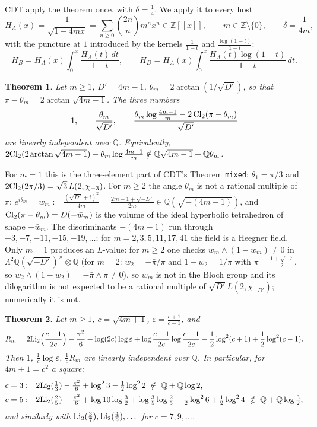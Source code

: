 \documentclass[11pt]{amsart}
\newtheorem{theorem}{Theorem}[section]
\theoremstyle{remark}
\newcommand{\Q}{\mathbb Q}\newcommand{\Z}{\mathbb Z}\newcommand{\R}{\mathbb R}\newcommand{\C}{\mathbb C}
\begin{document}
CDT apply the theorem once, with $\delta=\frac14$. We apply it to every host
\begin{equation}\label{host}
H_A(x)=\frac1{\sqrt{1-4mx}}=\sum_{n\ge0}\binom{2n}nm^nx^n\in\Z[[x]],\qquad m\in\Z\setminus\{0\},\qquad\delta=\frac1{4m},
\end{equation}
with the puncture at $1$ introduced by the kernels $\frac1{1-t}$ and $\frac{\log(1-t)}{1-t}$:
\[
H_B=H_A(x)\int_0^x\frac{H_A(t)\,dt}{1-t},\qquad H_D=H_A(x)\int_0^x\frac{H_A(t)\log(1-t)}{1-t}\,dt .
\]

\begin{theorem}\label{A}
Let $m\ge1$, $D'=4m-1$, $\theta_m=2\arctan(1/\sqrt{D'})$, so that $\pi-\theta_m=2\arctan\sqrt{4m-1}$. The three numbers
\[
1,\qquad\frac{\theta_m}{\sqrt{D'}},\qquad\frac{\theta_m\log\frac{4m-1}m-2\,\mathrm{Cl}_2(\pi-\theta_m)}{\sqrt{D'}}
\]
are linearly independent over $\Q$. Equivalently, $2\Cl(2\arctan\sqrt{4m-1})-\theta_m\log\frac{4m-1}m\notin\Q\sqrt{4m-1}+\Q\theta_m$.
\end{theorem}

For $m=1$ this is the three-element part of CDT's Theorem \texttt{mixed}: $\theta_1=\pi/3$ and $2\mathrm{Cl}_2(2\pi/3)=\sqrt3\,L(2,\chi_{-3})$. For $m\ge2$ the angle $\theta_m$ is not a rational multiple of $\pi$: $e^{i\theta_m}=w_m:=\frac{(\sqrt{D'}+i)^2}{4m}=\frac{2m-1+\sqrt{-D'}}{2m}\in\Q(\sqrt{-(4m-1)})$, and $\mathrm{Cl}_2(\pi-\theta_m)=D(-\bar w_m)$ is the volume of the ideal hyperbolic tetrahedron of shape $-\bar w_m$. The discriminants $-(4m-1)$ run through $-3,-7,-11,-15,-19,\dots$; for $m=2,3,5,11,17,41$ the field is a Heegner field. Only $m=1$ produces an $L$-value: for $m\ge2$ one checks $w_m\wedge(1-w_m)\ne0$ in $\Lambda^2\Q(\sqrt{-D'})^\times\otimes\Q$ (for $m=2$: $w_2=-\bar\pi/\pi$ and $1-w_2=1/\pi$ with $\pi=\frac{1+\sqrt{-7}}2$, so $w_2\wedge(1-w_2)=-\bar\pi\wedge\pi\ne0$), so $w_m$ is not in the Bloch group and its dilogarithm is not expected to be a rational multiple of $\sqrt{D'}L(2,\chi_{-D'})$; numerically it is not.

\begin{theorem}\label{B}
Let $m\ge1$, $c=\sqrt{4m+1}$, $\varepsilon=\frac{c+1}{c-1}$, and
\[
R_m=2\mathrm{Li}_2\Bigl(\frac{c-1}{2c}\Bigr)-\frac{\pi^2}6+\log(2c)\log\varepsilon+\log\frac{c+1}{2c}\log\frac{c-1}{2c}-\frac12\log^2(c+1)+\frac12\log^2(c-1).
\]
Then $1$, $\frac1c\log\varepsilon$, $\frac1cR_m$ are linearly independent over $\Q$. In particular, for $4m+1=c^2$ a square:
\begin{align*}
c=3:&\quad 2\Li(\tfrac13)-\tfrac{\pi^2}6+\log^23-\tfrac12\log^22\ \notin\ \Q+\Q\log2,\\
c=5:&\quad 2\Li(\tfrac25)-\tfrac{\pi^2}6+\log10\log\tfrac32+\log\tfrac35\log\tfrac25-\tfrac12\log^26+\tfrac12\log^24\ \notin\ \Q+\Q\log\tfrac32,
\end{align*}
and similarly with $\mathrm{Li}_2(\frac37),\mathrm{Li}_2(\frac49),\dots$ for $c=7,9,\dots$.
\end{theorem}
\end{document}
